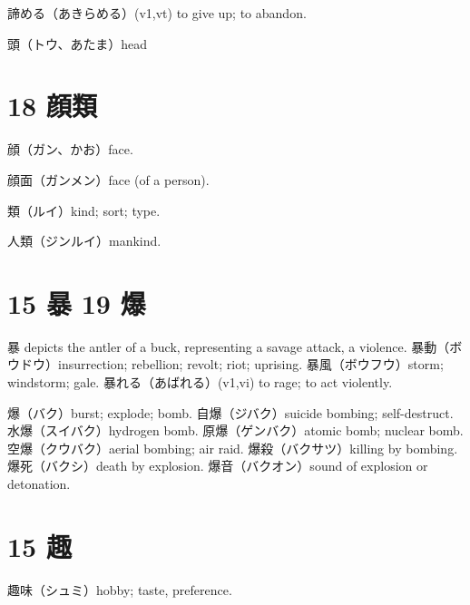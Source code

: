 諦める（あきらめる）(v1,vt)
to give up; to abandon.

頭（トウ、あたま）head

\section{18 顔類}

顔（ガン、かお）face.

顔面（ガンメン）face (of a person).

類（ルイ）kind; sort; type.

人類（ジンルイ）mankind.

\section{15 暴 19 爆}

暴 depicts the antler of a buck, representing a savage attack, a violence.
暴動（ボウドウ）insurrection; rebellion; revolt; riot; uprising.
暴風（ボウフウ）storm; windstorm; gale.
暴れる（あばれる）(v1,vi) to rage; to act violently.

爆（バク）burst; explode; bomb.
自爆（ジバク）suicide bombing; self-destruct.
水爆（スイバク）hydrogen bomb.
原爆（ゲンバク）atomic bomb; nuclear bomb.
空爆（クウバク）aerial bombing; air raid.
爆殺（バクサツ）killing by bombing.
爆死（バクシ）death by explosion.
爆音（バクオン）sound of explosion or detonation.

\section{15 趣}

趣味（シュミ）hobby; taste, preference.

